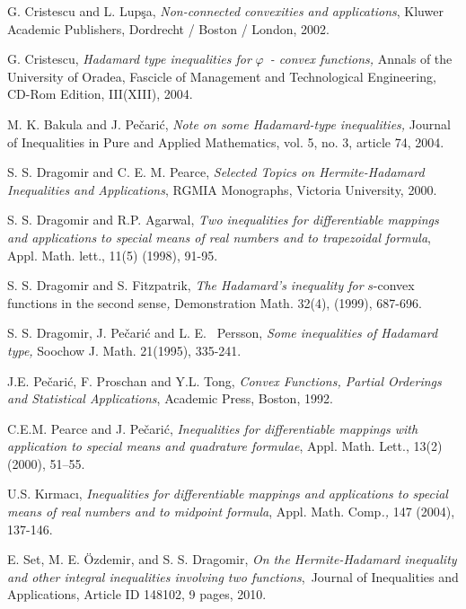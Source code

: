 \documentclass{amsart}
\theoremstyle{plain}
\numberwithin{equation}{section}
\begin{document}
\begin{thebibliography}{99}
 G. Cristescu and L. Lup\c{s}a, \textit{Non-connected
convexities and applications}, Kluwer Academic Publishers, Dordrecht /
Boston / London, 2002.

 G. Cristescu, \textit{Hadamard type inequalities for }$\varphi $\textit{\ - convex functions,} Annals of the University of Oradea,
Fascicle of Management and Technological Engineering, CD-Rom Edition,
III(XIII), 2004.

 M. K. Bakula and J. Pe\v{c}ari\'{c}, \textit{Note on some
Hadamard-type inequalities,} Journal of Inequalities in Pure and Applied
Mathematics, vol. 5, no. 3, article 74, 2004.

 S. S. Dragomir and C. E. M. Pearce, \textit{Selected
Topics on Hermite-Hadamard Inequalities and Applications}, RGMIA Monographs,
Victoria University, 2000.

 S. S. Dragomir and R.P. Agarwal, \textit{Two
inequalities for differentiable mappings and applications to special means
of real numbers and to trapezoidal formula}, Appl. Math. lett., 11(5)
(1998), 91-95.

 S. S. Dragomir and S. Fitzpatrik, \textit{The Hadamard's
inequality for }$s$-convex functions in the second sense\textit{, }Demonstration Math. 32(4), (1999), 687-696.

 S. S. Dragomir, J. Pe\v{c}ari\'{c} and L. E. \ Persson, 
\textit{Some inequalities of Hadamard type, }Soochow J. Math. 21(1995),
335-241.

 J.E. Pe\v{c}ari\'{c}, F. Proschan and Y.L. Tong, \textit{Convex Functions, Partial Orderings and Statistical Applications}, Academic
Press, Boston, 1992.

 C.E.M. Pearce and J. Pe\v{c}ari\'{c}, \textit{Inequalities
for differentiable mappings with application to special means and quadrature
formulae}, Appl. Math. Lett., 13(2) (2000), 51--55.

 U.S. K\i rmac\i , \textit{Inequalities for differentiable
mappings and applications to special means of real numbers and to midpoint
formula}, Appl. Math. Comp\textit{.,} 147 (2004), 137-146.

 E. Set, M. E. \"{O}zdemir, and S. S. Dragomir, \textit{On the
Hermite-Hadamard inequality and other integral inequalities involving two
functions},\ Journal of Inequalities and Applications, Article ID 148102, 9
pages, 2010.


\end{thebibliography}
\end{document}
